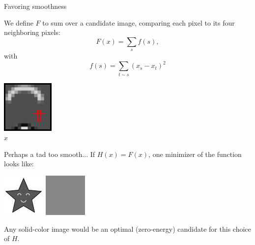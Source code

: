 \documentclass[10pt]{beamer}
\begin{document}
\begin{frame}{Favoring smoothness}

We define $F$ to sum over a candidate image, comparing each pixel to its four neighboring pixels:
\[ F(x) = \sum_{s}f(s), \]
with 
\[f(s) = \sum_{t \sim s} (x_s - x_t)^2 \]

\begin{center}
\includegraphics[scale=1.7]{img/compare_neighbors2}
\\ $x$
\end{center}
\end{frame}

\begin{frame}{Perhaps a tad too smooth...}
If $H(x) = F(x)$, one minimizer of the function looks like:

\begin{center}
\includegraphics[scale=0.8]{results/bw-star-tmp}
\hspace{4em}
\includegraphics[scale=0.8]{img/bw-fail-nodata}
\end{center}

Any solid-color image would be an optimal (zero-energy) candidate for this choice of $H$.
\end{frame}
\end{document}
